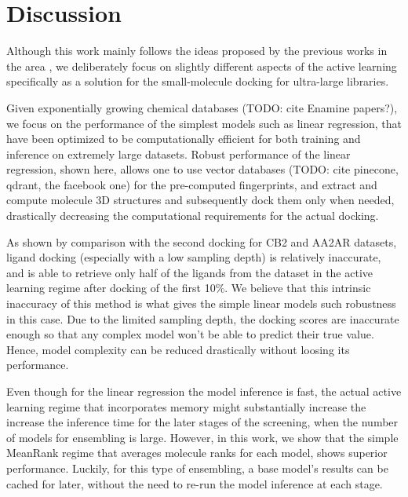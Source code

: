 \section{Discussion}

Although this work mainly follows the ideas proposed by the previous works in the area \cite{deepdocking, logistic_regression, Yang2021_shoichet_active_learning, Graff2021AcceleratingLearning}, we deliberately focus on slightly different aspects of the active learning specifically as a solution for the small-molecule docking for ultra-large libraries. 

Given exponentially growing chemical databases (TODO: cite Enamine papers?), we focus on the performance of the simplest models such as linear regression, that have been optimized to be computationally efficient for both training and inference on extremely large datasets. Robust performance of the linear regression, shown here, allows one to use vector databases (TODO: cite pinecone, qdrant, the facebook one) for the pre-computed fingerprints, and extract and compute molecule 3D structures and subsequently dock them only when needed, drastically decreasing the computational requirements for the actual docking.

As shown by comparison with the second docking for CB2 and AA2AR datasets, ligand docking (especially with a low sampling depth) is relatively inaccurate, and is able to retrieve only half of the ligands from the dataset in the active learning regime after docking of the first 10\%. We believe that this intrinsic inaccuracy of this method is what gives the simple linear models such robustness in this case. Due to the limited sampling depth, the docking scores are inaccurate enough so that any complex model won't be able to predict their true value. Hence, model complexity can be reduced drastically without loosing its performance.

Even though for the linear regression the model inference is fast, the actual active learning regime that incorporates memory might substantially increase the increase the inference time for the later stages of the screening, when the number of models for ensembling is large. However, in this work, we show that the simple MeanRank regime that averages molecule ranks for each model, shows superior performance. Luckily, for this type of ensembling, a base model's results can be cached for later, without the need to re-run the model inference at each stage.

